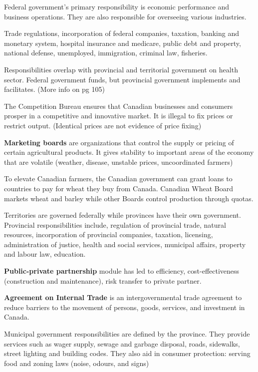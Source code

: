 \documentclass[english, 12pt]{article}
\begin{document}
Federal government's primary responsibility is economic performance and business operations. They are also responsible for overseeing various industries.
\begin{exmp}
Trade regulations, incorporation of federal companies, taxation, banking and monetary system, hospital insurance and medicare, public debt and property, national defense, unemployed, immigration, criminal law, fisheries.
\end{exmp}
Responsibilities overlap with provincial and territorial government on health sector.  Federal government funds, but provincial government implements and facilitates. (More info on pg 105)

The Competition Bureau ensures that Canadian businesses and consumers prosper in a competitive and innovative market. It is illegal to fix prices or restrict output. (Identical prices are not evidence of price fixing)
\begin{defn}
\textbf{Marketing boards} are organizations that control the supply or pricing of certain agricultural products. It gives stability to important areas of the economy that are volatile (weather, disease, unstable prices, uncoordinated farmers)
\end{defn}
To elevate Canadian farmers, the Canadian government can grant loans to countries to pay for wheat they buy from Canada. Canadian Wheat Board markets wheat and barley while other Boards control production through quotas.

Territories are governed federally while provinces have their own government. Provincial responsibilities include, regulation of provincial trade, natural resources, incorporation of provincial companies, taxation, licensing, administration of justice, health and social services, municipal affairs, property and labour law, education. 
\begin{defn}[PPP]
 \textbf{Public-private partnership} module has led to efficiency, cost-effectiveness (construction and maintenance), risk transfer to private partner.
 \end{defn}
 \begin{defn}
 \textbf{Agreement on Internal Trade} is an intergovernmental trade agreement to reduce barriers to the movement of persons, goods, services, and investment in Canada.
\end{defn}
Municipal government responsibilities are defined by the province. They provide services such as wager supply, sewage and garbage disposal, roads, sidewalks, street lighting and building codes. They also aid in consumer protection: serving food and zoning laws (noise, odours, and signs)
\end{document}

